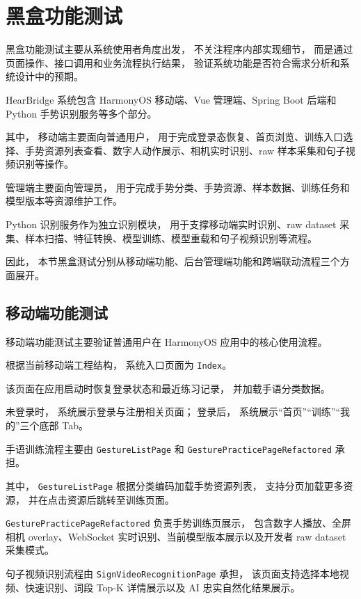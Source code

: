 
\section{黑盒功能测试}

黑盒功能测试主要从系统使用者角度出发，
不关注程序内部实现细节，
而是通过页面操作、接口调用和业务流程执行结果，
验证系统功能是否符合需求分析和系统设计中的预期。

HearBridge 系统包含 HarmonyOS 移动端、Vue 管理端、Spring Boot 后端和 Python 手势识别服务等多个部分。

其中，
移动端主要面向普通用户，
用于完成登录态恢复、首页浏览、训练入口选择、手势资源列表查看、数字人动作展示、相机实时识别、raw 样本采集和句子视频识别等操作。

管理端主要面向管理员，
用于完成手势分类、手势资源、样本数据、训练任务和模型版本等资源维护工作。

Python 识别服务作为独立识别模块，
用于支撑移动端实时识别、raw dataset 采集、样本扫描、特征转换、模型训练、模型重载和句子视频识别等流程。

因此，
本节黑盒测试分别从移动端功能、后台管理端功能和跨端联动流程三个方面展开。

\subsection{移动端功能测试}

移动端功能测试主要验证普通用户在 HarmonyOS 应用中的核心使用流程。

根据当前移动端工程结构，
系统入口页面为 \texttt{Index}。

该页面在应用启动时恢复登录状态和最近练习记录，
并加载手语分类数据。

未登录时，
系统展示登录与注册相关页面；
登录后，
系统展示“首页”“训练”“我的”三个底部 Tab。

手语训练流程主要由 \texttt{GestureListPage} 和 \texttt{GesturePracticePageRefactored} 承担。

其中，
\texttt{GestureListPage} 根据分类编码加载手势资源列表，
支持分页加载更多资源，
并在点击资源后跳转至训练页面。

\texttt{GesturePracticePageRefactored} 负责手势训练页展示，
包含数字人播放、全屏相机 overlay、WebSocket 实时识别、当前模型版本展示以及开发者 raw dataset 采集模式。

句子视频识别流程由 \texttt{SignVideoRecognitionPage} 承担，
该页面支持选择本地视频、快速识别、词段 Top-K 详情展示以及 AI 忠实自然化结果展示。

